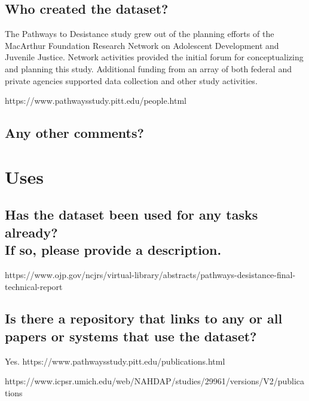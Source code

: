\documentclass[letterpaper, 10 pt, conference]{ieeeconf}  %
\newcommand{\subtitle}[1]{{\\ \small \normalfont \color{purple} #1}}
\begin{document}
\subsection{Who created the dataset?}

The Pathways to Desistance study grew out of the planning efforts of the MacArthur Foundation Research Network on Adolescent Development and Juvenile Justice. Network activities provided the initial forum for conceptualizing and planning this study. Additional funding from an array of both federal and private agencies supported data collection and other study activities.

https://www.pathwaysstudy.pitt.edu/people.html


\subsection{Any other comments?}

\lipsum[1]

\section{Uses}

\subsection{Has the dataset been used for any tasks already? \subtitle{If so, please provide a description.}}

https://www.ojp.gov/ncjrs/virtual-library/abstracts/pathways-desistance-final-technical-report




\subsection{Is there a repository that links to any or all papers or systems that use the dataset?}

Yes. https://www.pathwaysstudy.pitt.edu/publications.html

https://www.icpsr.umich.edu/web/NAHDAP/studies/29961/versions/V2/publications
\end{document}
